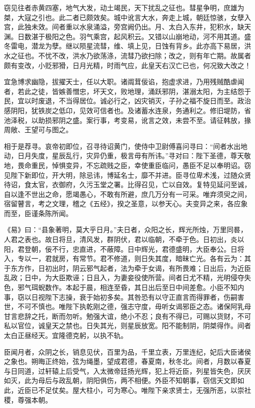 \documentclass[12pt,UTF8]{ctexbook}
\begin{document}
窃见往者赤黄四塞，地气大发，动土竭民，天下扰乱之征也。彗星争明，庶雄为桀，大寇之引也。此二者已颇效矣。城中讹言大水，奔走上城，朝廷惊骇，女孽入宫，此独未效。间者重以水泉涌溢，旁宫阙仍出。月、太白入东井，犯积水，缺天渊。日数湛于极阳之色。羽气乘宫，起风积云。又错以山崩地动，河不用其道。盛冬雷电，潜龙为孽。继以陨星流彗，维、填上见，日蚀有背乡。此亦高下易居，洪水之征也。不忧不改，洪水乃欲荡涤，流彗乃欲扫除；改之，则有年亡期。故属者颇有变改，小贬邪猾，日月光精，时雨气应，此皇天右汉亡已也，何况致大改之！



宜急博求幽隐，拔擢天士，任以大职。诸阘茸佞谄，抱虚求进，乃用残贼酷虐闻者，若此之徒，皆嫉善憎忠，坏天文，败地理，涌跃邪阴，湛溺太阳，为主结怨于民，宜以时废退，不当得居位。诚必行之，凶灾销灭，子孙之福不旋日而至。政治感阴阳，犹铁炭之低卬，见效可信者也。及诸蓄水连泉，务通利之。修旧堤防，省池泽税，以助损邪阴之盛。案行事，考变易，讹言之效，未尝不至。请征韩放，掾周敞、王望可与图之。



相于是荐寻。哀帝初即位，召寻待诏黄门，使侍中卫尉傅喜问寻曰：“间者水出地动，日月失度，星辰乱行，灾异仍重，极言毋有所讳。”寻对曰：陛下圣德，尊天敬地，畏命重民，悼惧变异，不忘疏贱之臣，幸使重臣临问，愚臣不足以奉明诏。窃见陛下新即位，开大明，除忌讳，博延名士，靡不并进。臣寻位卑术浅，过随众贤待诏，食太官，衣御府，久污玉堂之署。比得召见，亡以自效。复特见延问至诚，自以逢不世出之命，愿竭愚心，不敢有所避，庶几万分有一可采。唯弃须臾之间，宿留瞽言，考之文理，稽之《五经》，揆之圣意，以参天心。夫变异之来，各应象而至，臣谨条陈所闻。



《易》曰：“县象著明，莫大乎日月。”夫日者，众阳之长，辉光所烛，万里同晷，人君之表也。故日将旦，清风发，群阴伏，君以临朝，不牵于色。日初出，炎以阳，君登朝，佞不行，忠直进，不蔽障。日中辉光，君德盛明，大臣奉公。日将入，专以一，君就房，有常节。君不修道，则日失其度，暗昧亡光。各有云为：其于东方作，日初出时，阴云邪气起者，法为牵于女谒，有所畏难；日出后，为近臣乱政；日中，为大臣欺诬；日且入，为妻妾役使所营。间者日尤不精，光明侵夺失色，邪气珥蜺数作。本起于晨，相连至昏，其日出后至日中间差愈。小臣不知内事，窃以日视陛下志操，衰于始初多矣。其咎恐有以守正直言而得罪者，伤嗣害世，不可不慎也。唯陛下执乾刚之德，强志守度，毋听女谒邪臣之态。诸保阿乳母甘言悲辞之托，断而勿听。勉强大谊，绝小不忍；良有不得已，可赐以货财，不可私以官位，诚皇天之禁也。日失其光，则星辰放宽。阳不能制阴，阴桀得作。间者太白正昼经天。宜隆德克躬，以执不轨。



臣闻月者，众阴之长，销息见伏，百里为品，千里立表，万里连纪，妃后大臣诸侯之象也。朔晦正终始，弦为绳墨，望成君德，春夏南，秋冬北。间者，月数以春夏与日同道，过轩辕上后受气，入太微帝廷扬光辉，犯上将近臣，列星皆失色，厌厌如灭，此为母后与政乱朝，阴阳俱伤，两不相便。外臣不知朝事，窃信天文即如此，近臣已不足仗矣。屋大柱小，可为寒心。唯陛下亲求贤士，无强所恶，以崇社稷，尊强本朝。
\end{document}
